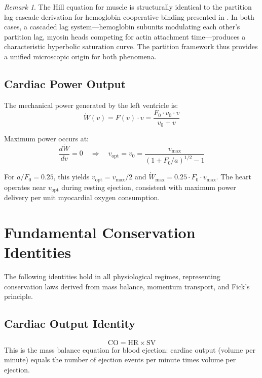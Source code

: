 \documentclass[10pt,twocolumn,a4paper]{article}
\theoremstyle{remark}
\newtheorem{remark}[theorem]{Remark}
\newcommand{\CO}{\mathrm{CO}}
\newcommand{\SV}{\mathrm{SV}}
\newcommand{\HR}{\mathrm{HR}}
\begin{document}
\begin{remark}
    The Hill equation for muscle is structurally identical to the partition lag cascade derivation for hemoglobin cooperative binding presented in \cite{sachikonye2024cardio}. In both cases, a cascaded lag system—hemoglobin subunits modulating each other's partition lag, myosin heads competing for actin attachment time—produces a characteristic hyperbolic saturation curve. The partition framework thus provides a unified microscopic origin for both phenomena.
\end{remark}

\subsection{Cardiac Power Output}

The mechanical power generated by the left ventricle is:
\begin{equation}
    \dot{W}(v) = F(v) \cdot v = \frac{F_0 \cdot v_0 \cdot v}{v_0 + v}
\end{equation}

Maximum power occurs at:
\begin{equation}
    \frac{d\dot{W}}{dv} = 0 \quad\Rightarrow\quad v_{\mathrm{opt}} = v_0 = \frac{v_{\max}}{(1 + F_0/a)^{1/2} - 1}
\end{equation}

For $a/F_0 = 0.25$, this yields $v_{\mathrm{opt}} = v_{\max}/2$ and $\dot{W}_{\max} = 0.25 \cdot F_0 \cdot v_{\max}$. The heart operates near $v_{\mathrm{opt}}$ during resting ejection, consistent with maximum power delivery per unit myocardial oxygen consumption.

\section{Fundamental Conservation Identities}
\label{sec:conservation}

The following identities hold in all physiological regimes, representing conservation laws derived from mass balance, momentum transport, and Fick's principle.

\subsection{Cardiac Output Identity}
\begin{equation}
    \boxed{\CO = \HR \times \SV}
    \label{eq:co_identity}
\end{equation}
This is the mass balance equation for blood ejection: cardiac output (volume per minute) equals the number of ejection events per minute times volume per ejection.
\end{document}
